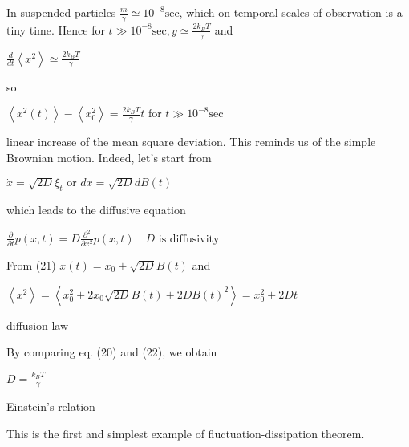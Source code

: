 In suspended particles $\frac{m}{\gamma} \simeq 10^{-8} \mathrm{sec}$, which on temporal scales of observation is a tiny time. Hence for $t \gg 10^{-8} \mathrm{sec}, y \simeq \frac{2 k_{B} T}{\gamma}$ and
\begin{DispWithArrows}
    $\frac{d}{d t}\left\langle x^{2}\right\rangle \simeq \frac{2 k_{B} T}{\gamma}$
\end{DispWithArrows}
so
\begin{DispWithArrows}[tag=20]
    $\left\langle x^{2}(t)\right\rangle-\left\langle x_{0}^{2}\right\rangle=\frac{2 k_{B} T}{\gamma} t \text { for } t \gg 10^{-8} \mathrm{sec}$
\end{DispWithArrows}
linear increase of the mean square deviation.
This reminds us of the simple Brownian motion. Indeed, let's start from
\begin{DispWithArrows}[tag=21]
    $\dot{x}=\sqrt{2 D} \xi_{t} \text { or } d x=\sqrt{2 D} d B(t)$
\end{DispWithArrows}
which leads to the diffusive equation
\begin{DispWithArrows}
    $\frac{\partial}{\partial t} p(x, t)=D \frac{\partial^{2}}{\partial x^{2}} p(x, t) \quad D \text { is diffusivity }$
\end{DispWithArrows}
From (21) $x(t)=x_{0}+\sqrt{2 D} B(t)$ and
\begin{DispWithArrows}[tag=22]
    $\left\langle x^{2}\right\rangle=\left\langle x_{0}^{2}+2 x_{0} \sqrt{2 D} B(t)+2 D B(t)^{2}\right\rangle=x_{0}^{2}+2 D t$
\end{DispWithArrows}
diffusion law

By comparing eq. (20) and (22), we obtain
\begin{DispWithArrows}[tag=23]
    $D=\frac{k_{B} T}{\gamma}$
\end{DispWithArrows}
Einstein's relation

This is the first and simplest example of fluctuation-dissipation theorem.

